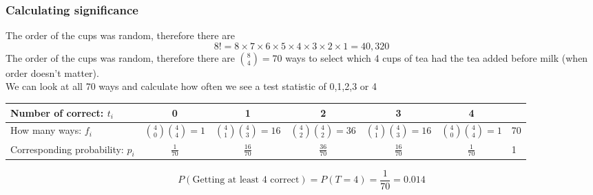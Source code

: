 \documentclass[a4paper]{article}
\begin{document}
\subsubsection{Calculating significance}
The order of the cups was random, therefore there are
\[
	8! = 8 \times 7 \times 6 \times 5 \times 4 \times 3 \times 2 \times 1 = 40,320
\]
The order of the cups was random, therefore there are \( \binom{8}{4} = 70 \) ways to select which 4 cups of tea had the tea added before milk (when order doesn't matter).\\
We can look at all 70 ways and calculate how often we see a test statistic of 0,1,2,3 or 4
\begin{table}[H]
	\centering
	\begin{tabular}{@{}lccccc|l@{}}
	\toprule
	Number of correct: \( t_i \) & 0 & 1 & 2 & 3 & 4 &  \\ \midrule
	How many ways: \( f_i \) & \( \binom{4}{0} \binom{4}{4} = 1 \) & \( \binom{4}{1} \binom{4}{3} = 16 \) & \( \binom{4}{2} \binom{4}{2} = 36 \) & \( \binom{4}{1} \binom{4}{3} = 16 \) & \( \binom{4}{0} \binom{4}{4} = 1 \) & 70 \\
	Corresponding probability: \( p_i \) & \( \frac{1}{70} \) & \( \frac{16}{70} \) & \( \frac{36}{70} \) & \( \frac{16}{70} \) & \( \frac{1}{70} \) & 1 \\ \bottomrule
	\end{tabular}
\end{table}
\[
	P(\text{Getting at least 4 correct}) = P(T=4) = \frac{1}{70} = 0.014
\]
\end{document}
